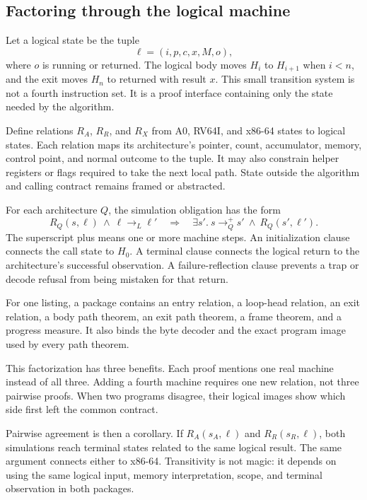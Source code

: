 \subsection{Factoring through the logical machine}

Let a logical state be the tuple
\[
  \ell=(i,p,c,x,M,o),
\]
where \(o\) is running or returned. The logical body moves \(H_i\) to
\(H_{i+1}\) when \(i<n\), and the exit moves \(H_n\) to returned with result
\(x\). This small transition system is not a fourth instruction set. It is a
proof interface containing only the state needed by the algorithm.

Define relations \(R_A\), \(R_R\), and \(R_X\) from A0, RV64I, and x86-64
states to logical states. Each relation maps its architecture's pointer,
count, accumulator, memory, control point, and normal outcome to the tuple.
It may also constrain helper registers or flags required to take the next
local path. State outside the algorithm and calling contract remains framed or
abstracted.

For each architecture \(Q\), the simulation obligation has the form
\[
 R_Q(s,\ell)\ \land\ \ell\longrightarrow_L\ell'
 \quad\Longrightarrow\quad
 \exists s'.\ s\longrightarrow_Q^{+}s'\ \land\ R_Q(s',\ell').
\]
The superscript plus means one or more machine steps. An initialization clause
connects the call state to \(H_0\). A terminal clause connects the logical
return to the architecture's successful observation. A failure-reflection
clause prevents a trap or decode refusal from being mistaken for that return.

\begin{definition}[title={Architecture-to-logical simulation package}]
For one listing, a package contains an entry relation, a loop-head relation,
an exit relation, a body path theorem, an exit path theorem, a frame theorem,
and a progress measure. It also binds the byte decoder and the exact program
image used by every path theorem.
\end{definition}

This factorization has three benefits. Each proof mentions one real machine
instead of all three. Adding a fourth machine requires one new relation, not
three pairwise proofs. When two programs disagree, their logical images show
which side first left the common contract.

Pairwise agreement is then a corollary. If \(R_A(s_A,\ell)\) and
\(R_R(s_R,\ell)\), both simulations reach terminal states related to the same
logical result. The same argument connects either to x86-64. Transitivity is
not magic: it depends on using the same logical input, memory interpretation,
scope, and terminal observation in both packages.

